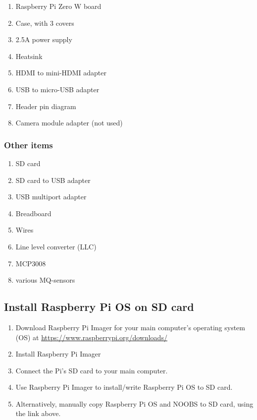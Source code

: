 \documentclass{article}
\begin{document}
\begin{enumerate}[noitemsep]
  \item Raspberry Pi Zero W board
  \item Case, with 3 covers
  \item 2.5A power supply
  \item Heatsink
  \item HDMI to mini-HDMI adapter
  \item USB to micro-USB adapter
  \item Header pin diagram
  \item Camera module adapter (not used)
\end{enumerate}

\subsubsection{Other items}

\begin{enumerate}[noitemsep]
  \item SD card
  \item SD card to USB adapter
  \item USB multiport adapter
  \item Breadboard
  \item Wires
  \item Line level converter (LLC)
  \item MCP3008
  \item various MQ-sensors

\end{enumerate}

\subsection{Install Raspberry Pi OS on SD card}

\begin{enumerate}
  \item Download Raspberry Pi Imager for your main computer's operating system (OS) at \url{https://www.raspberrypi.org/downloads/}
  \item Install Raspberry Pi Imager
  \item Connect the Pi's SD card to your main computer.
  \item Use Raspberry Pi Imager to install/write Raspberry Pi OS to SD card.
  \item Alternatively, manually copy Raspberry Pi OS and NOOBS to SD card, using the link above.
\end{enumerate}
\end{document}
